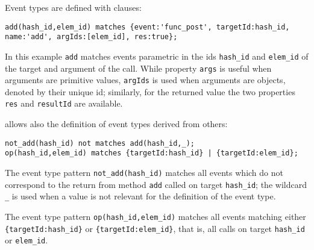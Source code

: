 Event types are defined with clauses:
\begin{lstlisting}[basicstyle=\ttfamily\scriptsize]
add(hash_id,elem_id) matches {event:'func_post', targetId:hash_id, name:'add', argIds:[elem_id], res:true};
\end{lstlisting}
In this example \lstinline{add} matches events parametric in the
ids \lstinline{hash_id} and \lstinline{elem_id} of the target and argument of the call. While property
\lstinline{args} is useful when arguments are primitive values, \lstinline{argIds} is used when arguments are objects, denoted by their unique id;
similarly, for the returned value the two properties \lstinline{res} and \lstinline{resultId} are available.




\rml allows also the definition of event types derived from others:

\begin{lstlisting}[basicstyle=\ttfamily\scriptsize]
not_add(hash_id) not matches add(hash_id,_);
op(hash_id,elem_id) matches {targetId:hash_id} | {targetId:elem_id};
\end{lstlisting}  
The event type pattern \lstinline{not_add(hash_id)} matches all events which do not correspond to the return from
method \lstinline{add} called on target \lstinline{hash_id}; the wildcard \lstinline!_! is used when a value is not relevant for
the definition of the event type.

The event type pattern \lstinline{op(hash_id,elem_id)} matches all events matching either \lstinline!{targetId:hash_id}! or
\lstinline!{targetId:elem_id}!, that is, all calls on target \lstinline{hash_id} or \lstinline{elem_id}.

